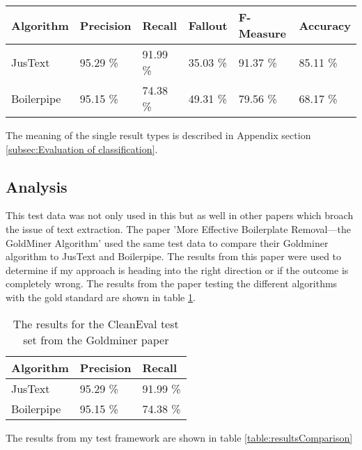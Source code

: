 \begin{tabular}{| p{2.2cm} | p{2.2cm} | p{2.2cm} | p{2.2cm} | p{2.2cm} | p{2.2cm} |}
    \hline
    \textbf{Algorithm}      & \textbf{Precision}  & \textbf{Recall}  & \textbf{Fallout}  & \textbf{F-Measure}  &\textbf{Accuracy} \\ \hline
    JusText     & 95.29 \%       &  91.99 \%  & 35.03 \% & 91.37 \% & 85.11 \%   \\ \hline
    Boilerpipe & 95.15 \%       &  74.38 \%  & 49.31 \% & 79.56 \% &  68.17 \% \\ \hline

\end{tabular}

The meaning of the single result types is described in Appendix section \ref{subsec:Evaluation of classification}.



\subsection{Analysis}

This test data was not only used in this but as well in other papers which broach the issue of text extraction. The paper 'More Effective Boilerplate Removal—the GoldMiner Algorithm' \cite{paper:goldminer} used the same test data to compare their Goldminer algorithm to JusText and Boilerpipe. The results from this paper were used to determine if my approach is heading into the right direction or if the outcome is completely wrong. 
The results from the paper testing the different algorithms with the gold standard  are shown in table \ref{table:resultsGoldminer}.

\begin{table}[!ht]
\begin{tabular}{| p{3cm} | p{3cm} | p{3cm} | }
    \hline
    \textbf{Algorithm}      & \textbf{Precision}  & \textbf{Recall} 				\\ \hline
    JusText     & 95.29 \%       &  91.99 \%		\\ \hline
    Boilerpipe & 95.15 \%       &  74.38 \%		\\ \hline
\end{tabular}
\caption[asdfasdf]{The results for the CleanEval test set from the Goldminer paper}
\label{table:resultsGoldminer}
\end{table}

The results from my test framework are shown in table \ref{table:resultsComparison} 

